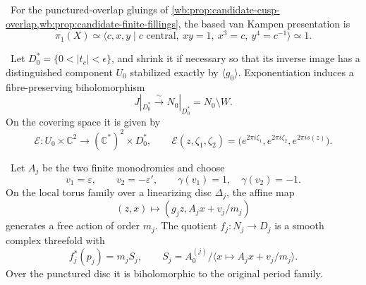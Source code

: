 
\begin{proposition}
\label{mapsI:top:prop:geometric-pi1}
\ For the punctured-overlap gluings of
\cref{wb:prop:candidate-cusp-overlap,wb:prop:candidate-finite-fillings}, the based
van Kampen presentation is
\[
 \pi_1(X)\simeq
 \langle c,x,y\mid c\text{ central},\ xy=1,\ x^3=c,\ y^4=c^{-1}\rangle
 \simeq1.
\tag{IL.5.24}
\]
\end{proposition}

\begin{proposition}
\label{wb:prop:candidate-cusp-overlap}
\ Let \(D_0^*=\{0<|t_c|<\epsilon\}\), and shrink it if necessary
so that its inverse image has a distinguished component \(U_0\) stabilized
exactly by \(\langle g_0\rangle\).  Exponentiation induces a
fibre-preserving biholomorphism
\[
 J|_{D_0^*}\xrightarrow{\ \sim\ }
 N_0|_{D_0^*}=N_0\setminus W.
\tag{2.8i}
\]
On the covering space it is given by
\[
 \mathcal E:U_0\times\mathbb C^2\longrightarrow
             (\mathbb C^*)^2\times D_0^*,
 \qquad
 \mathcal E(z,\zeta_1,\zeta_2)
 =\bigl(e^{2\pi i\zeta_1},e^{2\pi i\zeta_2},e^{2\pi is(z)}\bigr).
\tag{2.8ii}
\]
\end{proposition}

\begin{proposition}
\label{wb:prop:candidate-finite-fillings}
\ Let \(A_j\) be the two finite monodromies and choose
\[
 v_1=\varepsilon,\qquad v_2=-\varepsilon',
 \qquad \gamma(v_1)=1,\quad\gamma(v_2)=-1.
\]
On the local torus family over a linearizing disc \(\Delta_j\), the affine
map
\[
 (z,x)\longmapsto(g_jz,A_jx+v_j/m_j)
\tag{2.9}
\]
generates a free action of order \(m_j\).  The quotient
\(f_j:N_j\to D_j\) is a smooth complex threefold with
\[
 f_j^*(p_j)=m_jS_j,\qquad
 S_j=A_0^{(j)}/\langle x\mapsto A_jx+v_j/m_j\rangle.
\tag{2.10}
\]
Over the punctured disc it is biholomorphic to the original period family.
\end{proposition}

